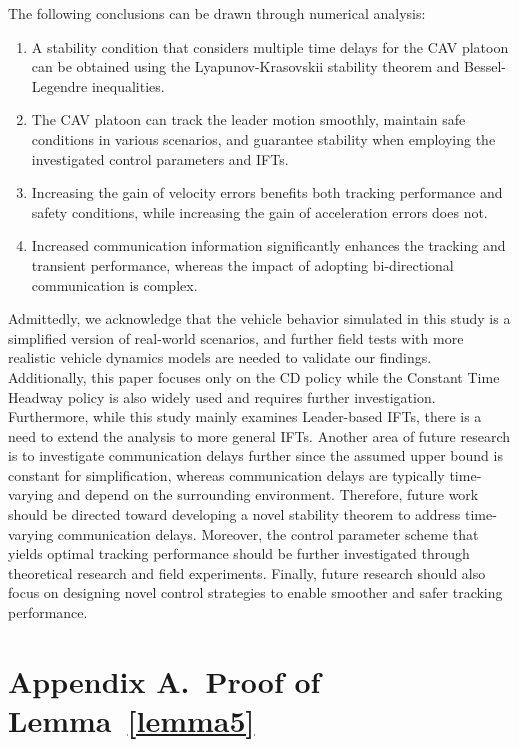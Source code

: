 \documentclass[a4paper]{cas-sc}
\begin{document}
The following conclusions can be drawn through numerical analysis:
\begin{enumerate}
  \item A stability condition that considers multiple time delays for the CAV platoon can be obtained using the Lyapunov-Krasovskii stability theorem and Bessel-Legendre inequalities.
  \item The CAV platoon can track the leader motion smoothly, maintain safe conditions in various scenarios, and guarantee stability when employing the investigated control parameters and IFTs.
  \item Increasing the gain of velocity errors benefits both tracking performance and safety conditions, while increasing the gain of acceleration errors does not.
  \item Increased communication information significantly enhances the tracking and transient performance, whereas the impact of adopting bi-directional communication is complex.
\end{enumerate}

Admittedly, we acknowledge that the vehicle behavior simulated in this study is a simplified version of real-world scenarios, and further field tests with more realistic vehicle dynamics models are needed to validate our findings. Additionally, this paper focuses only on the CD policy while the Constant Time Headway policy is also widely used and requires further investigation. Furthermore, while this study mainly examines Leader-based IFTs, there is a need to extend the analysis to more general IFTs. Another area of future research is to investigate communication delays further since the assumed upper bound is constant for simplification, whereas communication delays are typically time-varying and depend on the surrounding environment. Therefore, future work should be directed toward developing a novel stability theorem to address time-varying communication delays. Moreover, the control parameter scheme that yields optimal tracking performance should be further investigated through theoretical research and field experiments. Finally, future research should also focus on designing novel control strategies to enable smoother and safer tracking performance.



\appendix


\section*{Appendix A.~Proof of Lemma~\ref{lemma5}}
\label{AppendixA}
\end{document}
